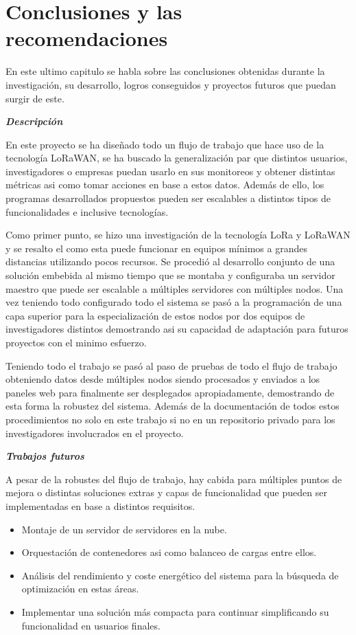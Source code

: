 
\section{Conclusiones y las recomendaciones}

En este ultimo capitulo se habla sobre las conclusiones obtenidas durante la investigación, su
desarrollo, logros conseguidos y proyectos futuros que puedan surgir de este.

    \textbf{\textit{Descripción}}

En este proyecto se ha diseñado todo un flujo de trabajo que hace uso de la tecnología LoRaWAN, se
ha buscado la generalización par que distintos usuarios, investigadores o empresas puedan usarlo en
sus monitoreos y obtener distintas métricas asi como tomar acciones en base a estos datos. Además de
ello, los programas desarrollados propuestos pueden ser escalables a distintos tipos de
funcionalidades e inclusive tecnologías.

Como primer punto, se hizo una investigación de la tecnología LoRa y LoRaWAN y se resalto el como
esta puede funcionar en equipos mínimos a grandes distancias utilizando pocos recursos. Se procedió
al desarrollo conjunto de una solución embebida al mismo tiempo que se montaba y configuraba un
servidor maestro que puede ser escalable a múltiples servidores con múltiples nodos. Una vez
teniendo todo configurado todo el sistema se pasó a la programación de una capa superior para la
especialización de estos nodos por dos equipos de investigadores distintos demostrando asi su
capacidad de adaptación para futuros proyectos con el minimo esfuerzo.

Teniendo todo el trabajo se pasó al paso de pruebas de todo el flujo de trabajo obteniendo datos
desde múltiples nodos siendo procesados y enviados a los paneles web para finalmente ser desplegados
apropiadamente, demostrando de esta forma la robustez del sistema. Además de la documentación de
todos estos procedimientos no solo en este trabajo si no en un repositorio privado para los
investigadores involucrados en el proyecto.

    \textbf{\textit{Trabajos futuros}}

A pesar de la robustes del flujo de trabajo, hay cabida para múltiples puntos de mejora o distintas
soluciones extras y capas de funcionalidad que pueden ser implementadas en base a distintos
requisitos.
\begin{itemize}
    \item Montaje de un servidor de servidores en la nube.
    \item Orquestación de contenedores asi como balanceo de cargas entre ellos.
    \item Análisis del rendimiento y coste energético del sistema para la búsqueda de optimización en estas áreas. 
    \item Implementar una solución más compacta para continuar simplificando su funcionalidad en usuarios finales.
\end{itemize}
